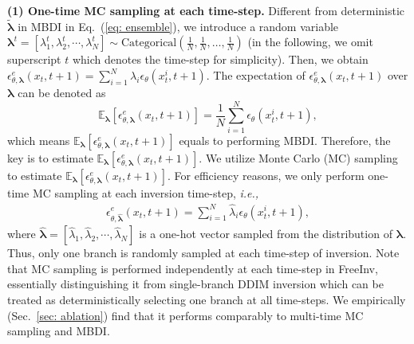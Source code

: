 \documentclass{article}
\begin{document}
\textbf{(1) One-time MC sampling at each time-step.} 
Different from deterministic $\tilde{\boldsymbol{\lambda}}$ in MBDI in Eq.~(\ref{eq: ensemble}), 
we introduce a random variable 
$\boldsymbol{\lambda}^t=[\lambda_1^t, \lambda_2^t, \cdots, \lambda_N^t]\sim \text{Categorical}\left(\frac{1}{N}, \frac{1}{N}, \ldots, \frac{1}{N}\right)$ (in the following, we omit superscript $t$ which denotes the time-step for simplicity). 
Then, we obtain $\epsilon_{\theta, \boldsymbol{\lambda}}^{e}\left(x_{t}, t+1\right) = \sum_{i=1}^{N}\lambda_i\epsilon_{\theta}\left(x_{t}^{i}, t+1\right).$
The expectation of $\epsilon_{\theta, \boldsymbol{\lambda}}^{e}\left(x_{t}, t+1\right)$ over $\boldsymbol{\lambda}$ can be denoted as
\begin{equation}
\mathbb{E}_{\boldsymbol{\lambda}} [\epsilon_{\theta,\boldsymbol{\lambda}}^{e}\left(x_{t}, t+1\right)]=\frac{1}{N}\sum_{i=1}^{N}\epsilon_{\theta}\left(x_{t}^{i}, t+1\right),
\end{equation}
which means $\mathbb{E}_{\boldsymbol{\lambda}}[\epsilon_{\theta, \boldsymbol{\lambda}}^{e}\left(x_{t}, t+1\right)]$ equals to performing MBDI.
Therefore, the key is to estimate $\mathbb{E}_{\boldsymbol{\lambda}}[\epsilon_{\theta, \boldsymbol{\lambda}}^{e}\left(x_{t}, t+1\right)]$.  
We utilize Monte Carlo (MC) sampling to estimate $\mathbb{E}_{\boldsymbol{\lambda}}[\epsilon_{\theta, \boldsymbol{\lambda}}^{e}\left(x_{t}, t+1\right)]$.  
For efficiency reasons, we only perform one-time MC sampling at each inversion time-step, \emph{i.e.,}
\vspace{-2mm}
\begin{align}
    \epsilon_{\theta, \hat{\boldsymbol{\lambda}}}^{e}\left(x_{t}, t+1\right) = \sum_{i=1}^{N}\hat{\lambda}_{i}\epsilon_{\theta}\left(x^i_{t}, t+1\right),
\label{eq: 1-step mc sampling}
\end{align}
where $\hat{\boldsymbol{\lambda}}=[\hat{\lambda}_1, \hat{\lambda}_2, \cdots, \hat{\lambda}_N]$ is a one-hot vector sampled from the distribution of $\boldsymbol{\lambda}$. Thus, only one branch is randomly sampled at each time-step of inversion. %
Note that MC sampling is performed independently at each time-step in FreeInv, essentially distinguishing it from single-branch DDIM inversion which can be treated as deterministically selecting one branch at all time-steps.
We empirically (Sec.~\ref{sec: ablation}) find that it performs comparably to multi-time MC sampling and MBDI.
\end{document}

